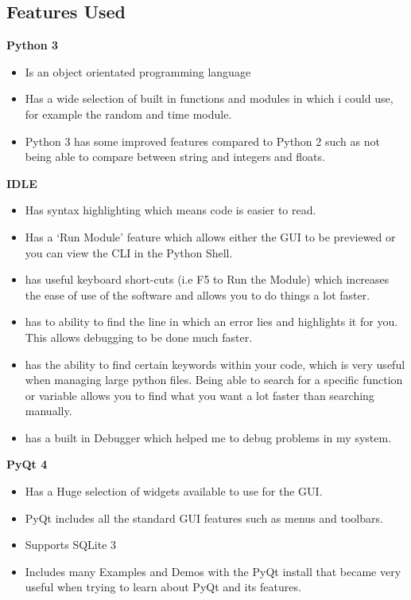 \subsection{Features Used}

\textbf{Python 3}
\begin{itemize}
	\item Is an object orientated programming language
	\item Has a wide selection of built in functions and modules in which i could use, for example the random and time module.
	\item Python 3 has some improved features compared to Python 2 such as not being able to compare between string and integers and floats.
\end{itemize}
\vspace{5mm}


\textbf{IDLE}
\begin{itemize}
	\item Has syntax highlighting which means code is easier to read.
	\item Has a `Run Module' feature which allows either the GUI to be previewed or you can view the CLI in the Python Shell.
	\item has useful keyboard short-cuts (i.e F5 to Run the Module) which increases the ease of use of the software and allows you to do things a lot faster.
	\item has to ability to find the line in which an error lies and highlights it for you. This allows debugging to be done much faster.
	\item has the ability to find certain keywords within your code, which is very useful when managing large python files. Being able to search for a specific function or variable allows you to find what you want a lot faster than searching manually.
	\item has a built in Debugger which helped me to debug problems in my system.
\end{itemize}
\vspace{5mm}

\textbf{PyQt 4}
\begin{itemize}
	\item Has a Huge selection of widgets available to use for the GUI.
	\item PyQt includes all the standard GUI features such as menus and toolbars.
	\item Supports SQLite 3
	\item Includes many Examples and Demos with the PyQt install that became very useful when trying to learn about PyQt and its features.
\end{itemize}
\vspace{5mm}

